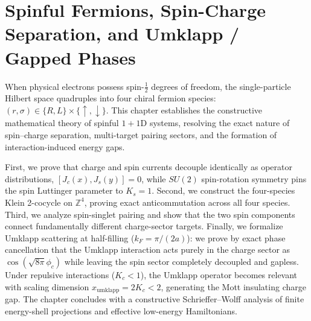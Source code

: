 \chapter[Spinful Fermions and Umklapp Phases]{Spinful Fermions, Spin-Charge Separation, and Umklapp / Gapped Phases}
\label{ch:spinful-umklapp}

When physical electrons possess spin-$\frac{1}{2}$ degrees of freedom, the single-particle
Hilbert space quadruples into four chiral fermion species: $(r, \sigma) \in \{R, L\} \times \{\uparrow, \downarrow\}$.
This chapter establishes the constructive mathematical theory of spinful $1+1$D systems,
resolving the exact nature of spin--charge separation, multi-target pairing sectors,
and the formation of interaction-induced energy gaps.

First, we prove that charge and spin currents decouple identically as operator distributions,
$[J_c(x), J_s(y)] = 0$, while $SU(2)$ spin-rotation symmetry pins the spin Luttinger parameter
to $K_s = 1$.  Second, we construct the four-species Klein 2-cocycle on $\mathbb Z^4$,
proving exact anticommutation across all four species.  Third, we analyze spin-singlet
pairing and show that the two spin components connect fundamentally different charge-sector targets.
Finally, we formalize Umklapp scattering at half-filling ($k_F = \pi/(2a)$): we prove by
exact phase cancellation that the Umklapp interaction acts purely in the charge sector as
$\cos(\sqrt{8\pi}\phi_c)$ while leaving the spin sector completely decoupled and gapless.
Under repulsive interactions ($K_c < 1$), the Umklapp operator becomes relevant with scaling
dimension $x_{\mathrm{umklapp}} = 2K_c < 2$, generating the Mott insulating charge gap.
The chapter concludes with a constructive Schrieffer--Wolff analysis of finite energy-shell
projections and effective low-energy Hamiltonians.






